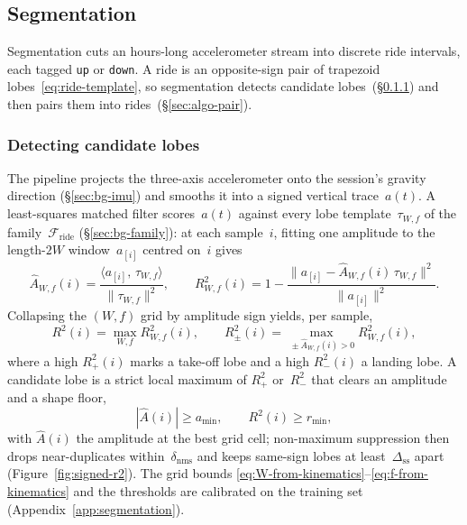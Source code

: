 \documentclass[manuscript,review,screen]{acmart}
\begin{document}
\subsection{Segmentation}
\label{sec:algo-seg}

Segmentation cuts an hours-long accelerometer stream into discrete
ride intervals, each tagged \texttt{up} or \texttt{down}.  A ride is
an opposite-sign pair of trapezoid lobes~\eqref{eq:ride-template}, so
segmentation detects candidate lobes~(\S\ref{sec:algo-detect}) and
then pairs them into rides~(\S\ref{sec:algo-pair}).

\subsubsection{Detecting candidate lobes}
\label{sec:algo-detect}

The pipeline projects the three-axis accelerometer onto the session's
gravity direction (\S\ref{sec:bg-imu}) and smooths it into a signed
vertical trace~$a(t)$.  A least-squares matched filter scores~$a(t)$
against every lobe template~$\tau_{W,f}$ of the
family~$\mathcal{F}_{\text{ride}}$ (\S\ref{sec:bg-family}): at each
sample~$i$, fitting one amplitude to the length-$2W$
window~$a_{[i]}$ centred on~$i$ gives
\begin{equation}
  \hat A_{W,f}(i)=
    \frac{\langle a_{[i]},\,\tau_{W,f}\rangle}{\|\tau_{W,f}\|^{2}},
  \qquad
  R^{2}_{W,f}(i)=
    1-\frac{\|a_{[i]}-\hat A_{W,f}(i)\,\tau_{W,f}\|^{2}}
           {\|a_{[i]}\|^{2}}.
  \label{eq:matched-filter}
\end{equation}
Collapsing the $(W,f)$ grid by amplitude sign yields, per sample,
\begin{equation}
  R^{2}(i)=\max_{W,f}R^{2}_{W,f}(i),
  \qquad
  R^{2}_{\pm}(i)=\max_{\,\pm\hat A_{W,f}(i)>0}R^{2}_{W,f}(i),
  \label{eq:signed-r2}
\end{equation}
where a high $R^{2}_{+}(i)$ marks a take-off lobe and a high
$R^{2}_{-}(i)$ a landing lobe.  A candidate lobe is a strict local
maximum of $R^{2}_{+}$ or~$R^{2}_{-}$ that clears an amplitude and a
shape floor,
\begin{equation}
  |\hat A(i)|\ge a_{\min},
  \qquad
  R^{2}(i)\ge r_{\min},
  \label{eq:detect-gate}
\end{equation}
with $\hat A(i)$ the amplitude at the best grid cell; non-maximum
suppression then drops near-duplicates within~$\delta_{\mathrm{nms}}$
and keeps same-sign lobes at least~$\Delta_{\mathrm{ss}}$ apart
(Figure~\ref{fig:signed-r2}).  The grid bounds
\eqref{eq:W-from-kinematics}--\eqref{eq:f-from-kinematics} and the
thresholds are calibrated on the training set
(Appendix~\ref{app:segmentation}).
\end{document}
